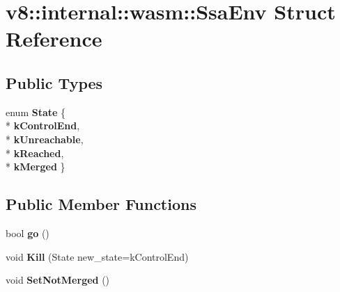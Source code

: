 \hypertarget{structv8_1_1internal_1_1wasm_1_1_ssa_env}{}\section{v8\+:\+:internal\+:\+:wasm\+:\+:Ssa\+Env Struct Reference}
\label{structv8_1_1internal_1_1wasm_1_1_ssa_env}
\subsection*{Public Types}
\begin{DoxyCompactItemize}
\item 
enum {\bfseries State} \{ \\*
{\bfseries k\+Control\+End}, 
\\*
{\bfseries k\+Unreachable}, 
\\*
{\bfseries k\+Reached}, 
\\*
{\bfseries k\+Merged}
 \}\hypertarget{structv8_1_1internal_1_1wasm_1_1_ssa_env_ad5675625356efbfac53c9250fb92892b}{}\label{structv8_1_1internal_1_1wasm_1_1_ssa_env_ad5675625356efbfac53c9250fb92892b}

\end{DoxyCompactItemize}
\subsection*{Public Member Functions}
\begin{DoxyCompactItemize}
\item 
bool {\bfseries go} ()\hypertarget{structv8_1_1internal_1_1wasm_1_1_ssa_env_a1353e423928501e1d0dfc0832c594896}{}\label{structv8_1_1internal_1_1wasm_1_1_ssa_env_a1353e423928501e1d0dfc0832c594896}

\item 
void {\bfseries Kill} (State new\+\_\+state=k\+Control\+End)\hypertarget{structv8_1_1internal_1_1wasm_1_1_ssa_env_a390819c500229334c9451b111a7f1251}{}\label{structv8_1_1internal_1_1wasm_1_1_ssa_env_a390819c500229334c9451b111a7f1251}

\item 
void {\bfseries Set\+Not\+Merged} ()\hypertarget{structv8_1_1internal_1_1wasm_1_1_ssa_env_a71d6ca36d13134540603fa9a6c7e932e}{}\label{structv8_1_1internal_1_1wasm_1_1_ssa_env_a71d6ca36d13134540603fa9a6c7e932e}

\end{DoxyCompactItemize}
